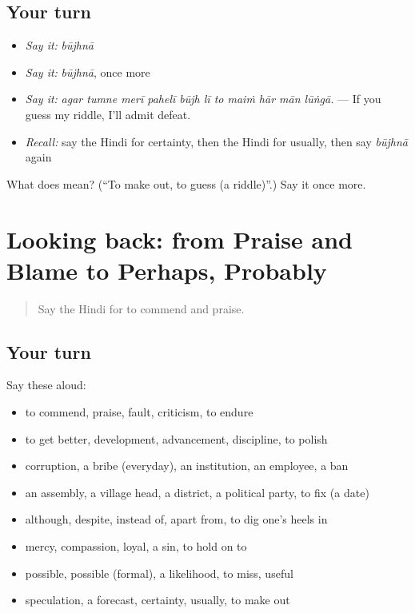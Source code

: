 \subsection*{Your turn}
\begin{itemize}
\raggedright
  \item \emph{Say it:} \emph{būjhnā}
  \item \emph{Say it:} \emph{būjhnā}, once more
  \item \emph{Say it:} \emph{agar tumne merī pahelī būjh lī to maiṁ hār mān lūṅgā.} — If you guess my riddle, I'll admit defeat.
  \item \emph{Recall:} say the Hindi for certainty, then the Hindi for usually, then say \emph{būjhnā} again
\end{itemize}

\begin{tcolorbox}[breakable,colback=teal!4,colframe=teal!35!black,title={Before you move on}]
What does  mean? (\textquotedblleft{}To make out, to guess (a riddle)\textquotedblright{}.) Say it once more.
\end{tcolorbox}
\section[(dialogue)]{Looking back: from Praise and Blame to Perhaps, Probably}

\label{lesson:HI-R374-review-367-374}



\begin{quote}
Say the Hindi for to commend and praise.
\end{quote}

\subsection*{Your turn}
Say these aloud:

\begin{itemize}
\raggedright
  \item to commend, praise, fault, criticism, to endure
  \item to get better, development, advancement, discipline, to polish
  \item corruption, a bribe (everyday), an institution, an employee, a ban
  \item an assembly, a village head, a district, a political party, to fix (a date)
  \item although, despite, instead of, apart from, to dig one's heels in
  \item mercy, compassion, loyal, a sin, to hold on to
  \item possible, possible (formal), a likelihood, to miss, useful
  \item speculation, a forecast, certainty, usually, to make out
\end{itemize}

